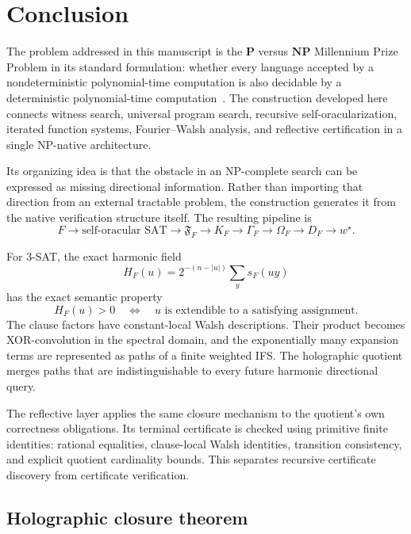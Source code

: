 \documentclass[11pt]{article}
\theoremstyle{plain}
\theoremstyle{definition}
\begin{document}
\section{Conclusion}
\label{sec:conclusion}

The problem addressed in this manuscript is the $\mathbf{P}$ versus $\mathbf{NP}$ Millennium Prize Problem in its standard formulation: whether every language accepted by a nondeterministic polynomial-time computation is also decidable by a deterministic polynomial-time computation~\cite{CookClayPvsNP}.  The construction developed here connects witness search, universal program search, recursive self-oracularization, iterated function systems, Fourier--Walsh analysis, and reflective certification in a single NP-native architecture.

Its organizing idea is that the obstacle in an NP-complete search can be expressed as missing directional information.  Rather than importing that direction from an external tractable problem, the construction generates it from the native verification structure itself.  The resulting pipeline is
\[
\boxed{
F
\longrightarrow
\text{self-oracular SAT}
\longrightarrow
\mathfrak F_F
\longrightarrow
K_F
\longrightarrow
\Gamma_F
\longrightarrow
\Omega_F
\longrightarrow
D_F
\longrightarrow
w^\star.
}
\]

For 3-SAT, the exact harmonic field
\[
H_F(u)
=
2^{-(n-|u|)}
\sum_y s_F(uy)
\]
has the exact semantic property
\[
H_F(u)>0
\quad\Longleftrightarrow\quad
u\text{ is extendible to a satisfying assignment}.
\]
The clause factors have constant-local Walsh descriptions.  Their product becomes XOR-convolution in the spectral domain, and the exponentially many expansion terms are represented as paths of a finite weighted IFS.  The holographic quotient merges paths that are indistinguishable to every future harmonic directional query.

The reflective layer applies the same closure mechanism to the quotient's own correctness obligations.  Its terminal certificate is checked using primitive finite identities: rational equalities, clause-local Walsh identities, transition consistency, and explicit quotient cardinality bounds.  This separates recursive certificate discovery from certificate verification.

\subsection{Holographic closure theorem}
\end{document}
